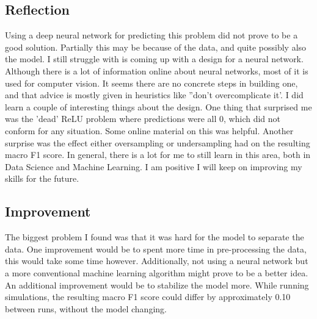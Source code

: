 \documentclass[preprint,12pt]{elsarticle}
\begin{document}
\subsection{Reflection}
Using a deep neural network for predicting this problem did not prove to be a good solution. Partially this may be because of the data, and quite possibly also the model. I still struggle with is coming up with a design for a neural network. Although there is a lot of information online about neural networks, most of it is used for computer vision. It seems there are no concrete steps in building one, and that advice is mostly given in heuristics like ''don't overcomplicate it'. I did learn a couple of interesting things about the design. One thing that surprised me was the 'dead' ReLU problem where predictions were all 0, which did not conform for any situation. Some online material on this was helpful. Another surprise was the effect either oversampling or undersampling had on the resulting macro F1 score. In general, there is a lot for me to still learn in this area, both in Data Science and Machine Learning. I am positive I will keep on improving my skills for the future.

\subsection{Improvement}
The biggest problem I found was that it was hard for the model to separate the data. One improvement would be to spent more time in pre-processing the data, this would take some time however. Additionally, not using a neural network but a more conventional machine learning algorithm might prove to be a better idea. An additional improvement would be to stabilize the model more. While running simulations, the resulting macro F1 score could differ by approximately 0.10 between runs, without the model changing.



\end{document}
